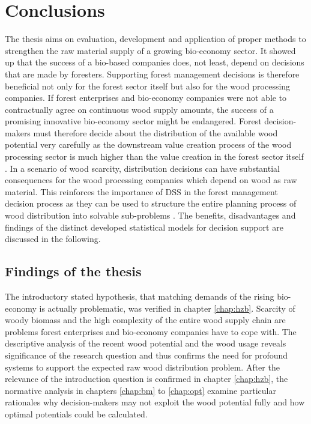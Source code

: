 \chapter{Conclusions}
\label{chap:discussion}
\newpage
\noindent
The thesis aims on evaluation, development and application of proper methods to strengthen the raw material supply of a growing bio-economy sector. It showed up that the success of a bio-based companies does, not least, depend on decisions that are made by foresters. Supporting forest management decisions is therefore beneficial not only for the forest sector itself but also for the wood processing companies. If forest enterprises and bio-economy companies were not able to contractually agree on continuous wood supply amounts, the success of a promising innovative bio-economy sector might be endangered. Forest decision-makers must therefore decide about the distribution of the available wood potential very carefully as the downstream value creation process of the wood processing sector is much higher than the value creation in the forest sector itself \citep[p. 221,223]{elchichakli_2016}. In a scenario of wood scarcity, distribution decisions can have substantial consequences for the wood processing companies which depend on wood as raw material. This reinforces the importance of DSS in the forest management decision process as they can be used to structure the entire planning process of wood distribution into solvable sub-problems \citep[p. 1065-1067]{pretzsch_2008}. The benefits, disadvantages and findings of the distinct developed statistical models for decision support are discussed in the following.

\section{Findings of the thesis}
\label{sec:discussion:findings}
The introductory stated hypothesis, that matching demands of the rising bio-economy is actually problematic, was verified in chapter \ref{chap:hzb}. Scarcity of woody biomass and the high complexity of the entire wood supply chain are problems forest enterprises and bio-economy companies have to cope with. The descriptive analysis of the recent wood potential and the wood usage reveals significance of the research question and thus confirms the need for profound systems to support the expected raw wood distribution problem. After the relevance of the introduction question is confirmed in chapter \ref{chap:hzb}, the normative analysis in chapters \ref{chap:bm} to \ref{chap:opt} examine particular rationales why decision-makers may not exploit the wood potential fully and how optimal potentials could be calculated.

